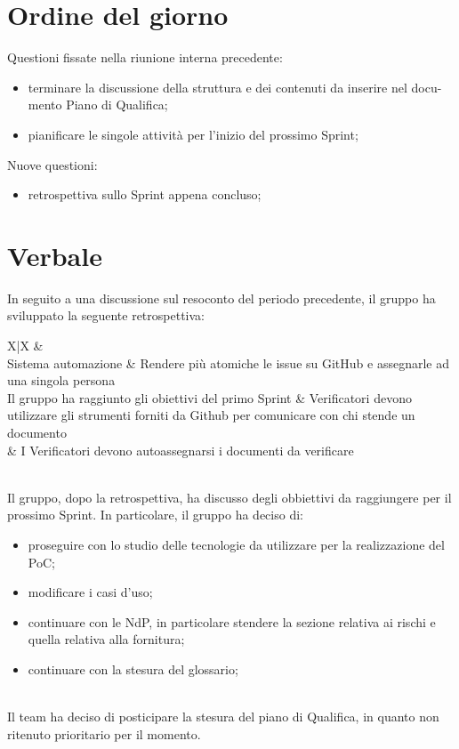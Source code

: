 \documentclass[12pt]{article}
\begin{document}
    \section{Ordine del giorno}
        Questioni fissate nella riunione interna precedente:
    	\begin{itemize}
    		\item terminare la discussione della struttura e dei contenuti da inserire nel docu-
			mento Piano di Qualifica;
			\item pianificare le singole attività per l’inizio del prossimo Sprint;
    	\end{itemize}
    	Nuove questioni:
    	\begin{itemize}
    		\item retrospettiva sullo Sprint appena concluso;
    	\end{itemize}
    
    \section{Verbale}

	In seguito a una discussione sul resoconto del periodo precedente, il gruppo ha sviluppato la seguente retrospettiva:
		\begin{table}[H]
			\begin{tabularx}{\textwidth}{X|X}
				\hline
				&
				\\\hline\hline
				Sistema automazione
				&
				Rendere più atomiche le issue su GitHub e assegnarle ad una singola persona
				\\\hline
				Il gruppo ha raggiunto gli obiettivi del primo Sprint
				&
				Verificatori devono utilizzare gli strumenti forniti da Github per comunicare con chi stende un documento
				\\\hline
				&
				I Verificatori devono autoassegnarsi i documenti da verificare
			\end{tabularx}
			\caption{retrospettiva del 04/12/2023.}
		\end{table}
		\noindent\\
		Il gruppo, dopo la retrospettiva, ha discusso degli obbiettivi da raggiungere per il prossimo Sprint. In particolare, il gruppo ha deciso di:
		\begin{itemize}
			\item proseguire con lo studio delle tecnologie da utilizzare per la realizzazione del PoC;
			\item modificare i casi d'uso;
			\item continuare con le NdP, in particolare stendere la sezione relativa ai rischi e quella relativa alla fornitura;
			\item continuare con la stesura del glossario;
		\end{itemize}
		\noindent\\
		Il team ha deciso di posticipare la stesura del piano di Qualifica, in quanto non ritenuto prioritario per il momento.
\end{document}
